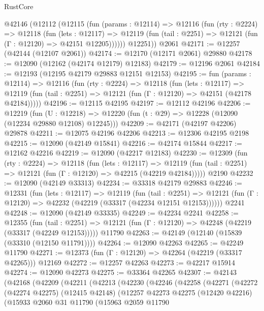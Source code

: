 \begin{lexlean}{RustCore}
\begin{coremodule}
    @42146
      (@12112
        (@12115
          (fun (params : @12114) =>
          @12116
            (fun (rty : @2224) =>
            @12118
              (fun (lets : @12117) =>
              @12119 (fun (tail : @2251) => @12121 (fun (Γ : @12120) => @42151 @12205))))))
        @12251))
    @2061
@42171 := @12257 (@42144 (@12107 @2061))
@42174 := @12170 (@12171 @2061) @29880
@42178 := @12090 (@12162 (@42174 @12179) @12183)
@42179 := @12196 @2061
@42184 := @12193 (@12195 @42179 @29883 @12151 @12153)
@42195 := fun (params : @12114) =>
  @12116
    (fun (rty : @2224) =>
    @12118
      (fun (lets : @12117) =>
      @12119 (fun (tail : @2251) => @12121 (fun (Γ : @12120) => @42151 (@42178 @42184)))))
@42196 := @12115 @42195
@42197 := @12112 @42196
@42206 := @12219
    (fun (U : @12218) => @12220 (fun (t : @29) => @12228 (@12090 (@12234 @29880 @12108) @12245)))
@42209 := @42171 (@42197 @42206) @29878
@42211 := @12075 @42196 @42206
@42213 := @12306 @42195 @2198
@42215 := @12090 (@42149 @15841)
@42216 := @42174 @15844
@42217 := @12162 @42216
@42219 := @12090 (@42217 @12183)
@42230 := @12309
    (fun (rty : @2224) =>
    @12118
      (fun (lets : @12117) =>
      @12119 (fun (tail : @2251) => @12121 (fun (Γ : @12120) => @42215 (@42219 @42184)))))
    @2190
@42232 := @12090 (@42149 @33313)
@42234 := @33318 @42179 @29883
@42246 := @12331
    (fun (lets : @12117) =>
    @12119
      (fun (tail : @2251) =>
      @12121 (fun (Γ : @12120) => @42232 (@42219 (@33317 (@42234 @12151 @12153))))))
    @2241
@42248 := @12090 (@42149 @33335)
@42249 := @42234 @2241
@42258 := @12355
    (fun (tail : @2251) => @12121 (fun (Γ : @12120) => @42248 (@42219 (@33317 (@42249 @12153)))))
    @11790
@42263 := @42149 (@12140 (@15839 (@33310 (@12150 @11791))))
@42264 := @12090 @42263
@42265 := @42249 @11790
@42271 := @12373 (fun (Γ : @12120) => @42264 (@42219 (@33317 @42265))) @12169
@42272 := @12257 @42263
@42273 := @42217 @15914
@42274 := @12090 @42273
@42275 := @33364 @42265
@42307 := @42143
    (@42168
      (@42209
        (@42211
          (@42213
            (@42230
              (@42246
                (@42258
                  (@42271
                    (@42272
                      (@42274 @42275)
                      (@12415 @42148)
                      (@12257
                        @42273
                        @42275
                        (@12420 @42216)
                        (@15933
                          @2060
                          @31
                          @11790
                          (@15963
                            @2059
                            @11790

\end{coremodule}
\end{lexlean}
